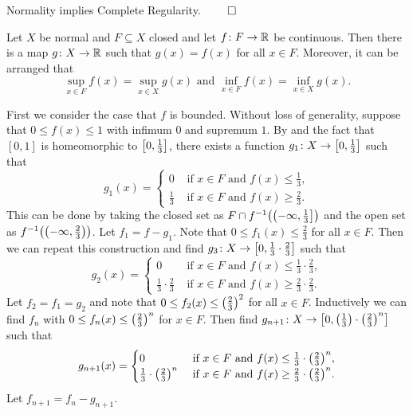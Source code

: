 \documentclass[letterpaper, 11pt, oneside]{book}
\begin{document}
\begin{cor}
  Normality implies Complete Regularity. $\qed$
\end{cor}

\begin{thrm}
  Let $X$ be normal and $F \subseteq X$ closed and let $f\colon F \to \mathbb{R}$ be continuous.
  Then there is a map $g\colon X \to \mathbb{R}$ such that $g(x) = f(x)$ for all $x \in F$.
  Moreover, it can be arranged that
  \[
    \sup_{x \in F} f(x) = \sup_{x \in X} g(x) \text{ and } \inf_{x \in F} f(x) = \inf_{x \in X} g(x).
  \]
\end{thrm}
\begin{pf}
  First we consider the case that $f$ is bounded.
  Without loss of generality, suppose that $0 \leq f(x) \leq 1$ with infimum $0$ and supremum $1$.
  By  and the fact that $[0, 1]$ is homeomorphic to $\bqty{0, \frac{1}{3}}$, there exists a function $g_{1}\colon X \to \bqty{0, \frac{1}{3}}$ such that
  \[
    g_{1}(x) = \begin{cases}
                 0           & \text{ if } x \in F \text{ and } f(x) \leq \frac{1}{3}, \\
                 \frac{1}{3} & \text{ if } x \in F \text{ and } f(x) \geq \frac{2}{3}.
               \end{cases}
  \]
  This can be done by taking the closed set as $F \cap f^{-1}\pqty{\left(-\infty, \frac{1}{3}\right]}$ and the open set as $f^{-1}\pqty{\pqty{-\infty, \frac{2}{3}}}$.
  Let $f_{1} = f - g_{1}$.
  Note that $0 \leq f_{1}(x) \leq \frac{2}{3}$ for all $x \in F$.
  Then we can repeat this construction and find $g_{3}\colon X \to \bqty{0, \frac{1}{3} \cdot \frac{2}{3}}$ such that
  \[
    g_{2}(x) = \begin{cases}
                 0           & \text{ if } x \in F \text{ and } f(x) \leq \frac{1}{3} \cdot \frac{2}{3}, \\
                 \frac{1}{3} \cdot \frac{2}{3} & \text{ if } x \in F \text{ and } f(x) \geq \frac{2}{3} \cdot \frac{2}{3}.
               \end{cases}
  \]
  Let $f_{2} = f_{1} = g_{2}$ and note that $0 \leq f_{2}(x) \leq \pqty{\frac{2}{3}}^{2}$ for all $x \in F$.
  Inductively we can find $f_{n}$ with $0 \leq f_{n}(x) \leq \pqty{\frac{2}{3}}^{n}$ for $x \in F$.
  Then find $g_{n + 1}\colon X \to \bqty{0, \pqty{\frac{1}{3}} \cdot \pqty{\frac{2}{3}}^{n}}$ such that
  \[
    g_{n + 1}(x) = \begin{cases}
                 0           & \text{ if } x \in F \text{ and } f(x) \leq \frac{1}{3} \cdot \pqty{\frac{2}{3}}^{n}, \\
                 \frac{1}{3} \cdot \pqty{\frac{2}{3}}^{n} & \text{ if } x \in F \text{ and } f(x) \geq \frac{2}{3} \cdot \pqty{\frac{2}{3}}^{n}.
               \end{cases}
  \]
  Let $f_{n + 1} = f_{n} - g_{n + 1}$.


\end{pf}
\end{document}
